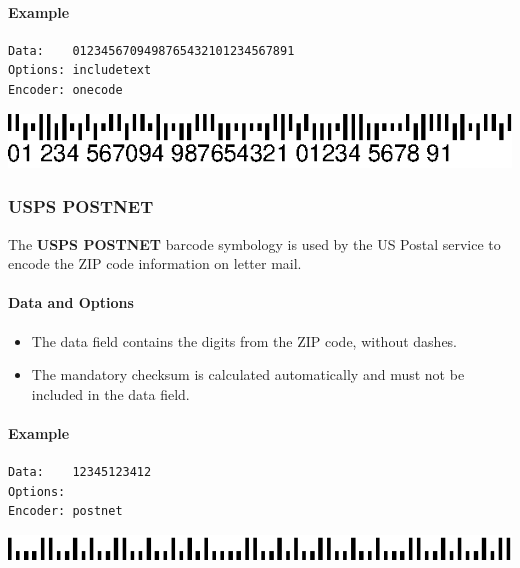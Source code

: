 \hypertarget{example-13}{%
\paragraph{Example}\label{example-13}}

\begin{verbatim}
Data:    0123456709498765432101234567891
Options: includetext
Encoder: onecode
\end{verbatim}

\includegraphics{images/onecode-1.eps}

\hypertarget{usps-postnet}{%
\subsubsection{USPS POSTNET}\label{usps-postnet}}

The \textbf{USPS POSTNET} barcode symbology is used by the US Postal
service to encode the ZIP code information on letter mail.

\hypertarget{data-and-options-51}{%
\paragraph{Data and Options}\label{data-and-options-51}}

\begin{itemize}
\tightlist
\item
  The data field contains the digits from the ZIP code, without dashes.
\item
  The mandatory checksum is calculated automatically and must not be
  included in the data field.
\end{itemize}

\hypertarget{example-14}{%
\paragraph{Example}\label{example-14}}

\begin{verbatim}
Data:    12345123412
Options: 
Encoder: postnet
\end{verbatim}

\includegraphics{images/postnet-1.eps}

